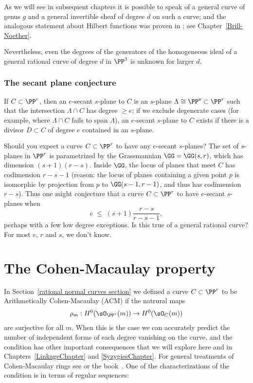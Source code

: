 As we will see in subsequent chapters it is possible to speak of a general curve of genus $g$
and a general invertible sheaf of degree $d$ on such a curve; and the analogous statement 
about Hilbert functions  was proven in \cite{ELarson2018}; see Chapter~\ref{Brill-Noether}.

Nevertheless, even the degrees of the generators of the homogeneous ideal of a general
rational curve of degree $d$ in $\PP^3$ is unknown for larger $d$. 

\subsubsection{The secant plane conjecture}

If $C \subset \PP^r$, then an $e$-secant $s$-plane to $C$ is an $s$-plane $\Lambda \cong \PP^s \subset \PP^r$ such that the intersection $\Lambda \cap C$ has degree $\geq e$; if we exclude degenerate cases (for example, where $\Lambda \cap C$ fails to span $\Lambda$), an $e$-secant $s$-plane to $C$ exists if there is a divisor $D \subset C$ of degree $e$  contained in an $s$-plane.

Should you expect a curve $C \subset \PP^r$ to have any $e$-secant $s$-planes? The set of $s$-planes in $\PP^r$ is parametrized by the Grassmannian $\GG = \GG(s,r)$, which has dimension $(s+1)(r-s)$. Inside $\GG$, the locus of planes that meet $C$ has codimension $r-s-1$ (reason: the locus of planes containing a given point $p$ is isomorphic
by projection from $p$ to $\GG(s-1,r-1)$, and thus has codimension $r-s$). Thus one might conjecture that a curve $C \subset \PP^r$ to have $e$-secant $s$-planes when 
$$
e \; \leq \; (s+1)\frac{r-s}{r-s-1},
$$
perhaps with a few low degree exceptions. Is this true of a general rational curve? For most $e$, $r$ and $s$, we don't know.

\section{The Cohen-Macaulay property}\label{ACM}

In Section~\ref{rational normal curves section} we defined a curve $C\subset \PP^{r}$ to be Arithmetically Cohen-Macaulay (ACM) if the natrural maps
$$
\rho_m: H^0(\sO_{\PP^r}(m)) \to H^0(\sO_{C}(m))
$$
are surjective for all $m$. When this is the case we can accurately predict the number of independent forms of
each degree vanishing on the curve, and the condition has other important consequences that we will explore here and in Chapters~\ref{LinkageChapter} and \ref{SyzygiesChapter}. For general treatments of 
Cohen-Macaulay rings see \cite[Chapter 18]{Eisenbud1995} or the book~\cite{BrunsHerzog}. One of the characterizations of the condition is in terms of regular sequences:

